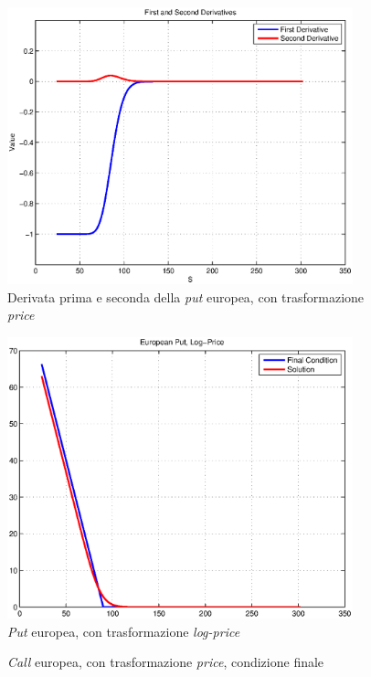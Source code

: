 \documentclass[a4paper,10pt]{report}
\theoremstyle{plain}
\theoremstyle{definition}
\theoremstyle{remark}
\begin{document}
\begin{figure}[htp!]
\begin{center}
\includegraphics[width=10cm]{img/test1-derivatives.eps}
\caption{Derivata prima e seconda della \emph{put} europea, con trasformazione \emph{price}}
\label{fig:test1-derivative}
\end{center}
\end{figure}
\begin{figure}[htp!]
\begin{center}
\includegraphics[width=10cm]{img/test1-put1dlogprice.eps}
\caption{\emph{Put} europea, con trasformazione \emph{log-price}}
\label{fig:test1-put1d-logprice}
\end{center}
\end{figure}
\begin{figure}[htp!]
\begin{center}
\caption{\emph{Call} europea, con trasformazione \emph{price}, condizione finale}
\label{fig:test1-call1d-fc}
\end{center}
\end{figure}
\end{document}
